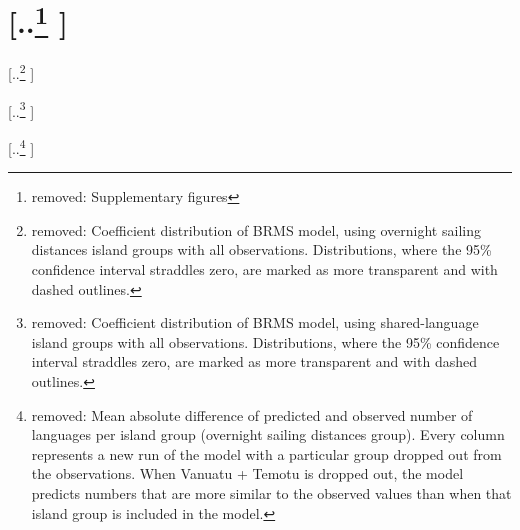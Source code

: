 \documentclass[unnumsec,webpdf,modern,medium]{oup-authoring-template}
\providecommand{\DIFdeltex}[1]{{\protect\color{red} [..\footnote{removed: #1} ]}} %
\providecommand{\DIFdelFL}[1]{\DIFdel{#1}} %
\providecommand{\DIFdel}[1]{\texorpdfstring{\DIFdeltex{#1}}{}} %
\begin{document}
\section{\DIFdel{Supplementary figures}}
\addtocounter{section}{-1}%


{%
\DIFdelFL{Coefficient distribution of BRMS model, using overnight sailing distances island groups with all observations. Distributions, where the 95\% confidence interval straddles zero, are marked as more transparent and with dashed outlines.}}


{%
\DIFdelFL{Coefficient distribution of BRMS model, using shared-language island groups with all observations. Distributions, where the 95\% confidence interval straddles zero, are marked as more transparent and with dashed outlines.}}


{%
\DIFdelFL{Mean absolute difference of predicted and observed number of languages per island group (overnight sailing distances group). Every column represents a new run of the model with a particular group dropped out from the observations. When Vanuatu + Temotu is dropped out, the model predicts numbers that are more similar to the observed values than when that island group is included in the model.}}
\end{document}
